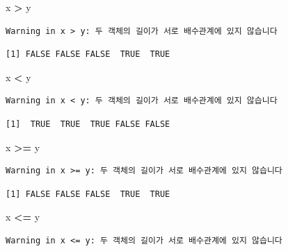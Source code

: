 \documentclass[
  11pt,
]{krantz}
\newenvironment{Shaded}{\begin{snugshade}}{\end{snugshade}}
\newcommand{\NormalTok}[1]{#1}
\newcommand{\OperatorTok}[1]{\textcolor[rgb]{0.43,0.43,0.43}{\textbf{#1}}}
\newcommand{\StringTok}[1]{\textcolor[rgb]{0.5,0.5,0.5}{#1}}
\begin{document}
\begin{Shaded}
\begin{Highlighting}[]
\NormalTok{x }\OperatorTok{>}\StringTok{ }\NormalTok{y}
\end{Highlighting}
\end{Shaded}

\begin{verbatim}
Warning in x > y: 두 객체의 길이가 서로 배수관계에 있지 않습니다
\end{verbatim}

\begin{verbatim}
[1] FALSE FALSE FALSE  TRUE  TRUE
\end{verbatim}

\begin{Shaded}
\begin{Highlighting}[]
\NormalTok{x }\OperatorTok{<}\StringTok{ }\NormalTok{y}
\end{Highlighting}
\end{Shaded}

\begin{verbatim}
Warning in x < y: 두 객체의 길이가 서로 배수관계에 있지 않습니다
\end{verbatim}

\begin{verbatim}
[1]  TRUE  TRUE  TRUE FALSE FALSE
\end{verbatim}

\begin{Shaded}
\begin{Highlighting}[]
\NormalTok{x }\OperatorTok{>=}\StringTok{ }\NormalTok{y}
\end{Highlighting}
\end{Shaded}

\begin{verbatim}
Warning in x >= y: 두 객체의 길이가 서로 배수관계에 있지 않습니다
\end{verbatim}

\begin{verbatim}
[1] FALSE FALSE FALSE  TRUE  TRUE
\end{verbatim}

\begin{Shaded}
\begin{Highlighting}[]
\NormalTok{x }\OperatorTok{<=}\StringTok{ }\NormalTok{y}
\end{Highlighting}
\end{Shaded}

\begin{verbatim}
Warning in x <= y: 두 객체의 길이가 서로 배수관계에 있지 않습니다
\end{verbatim}
\end{document}
